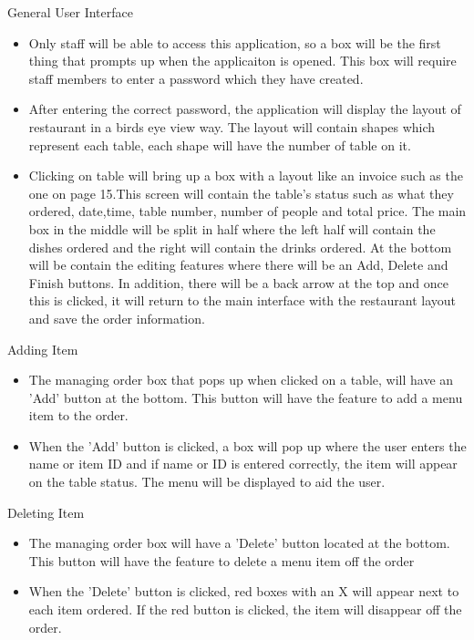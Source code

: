 General User Interface
\begin{itemize}
	\item Only staff will be able to access this application, so a box will be the first thing that prompts up when the applicaiton is opened. This box will require staff members to enter a password which they have created.
	\item After entering the correct password, the application will display the layout of restaurant in a birds eye view way. The layout will contain shapes which represent each table, each shape will have the number of table on it.
	\item Clicking on table will bring up a box with a layout like an invoice such as the one on page 15.This screen will contain the table's status such as what they ordered, date,time, table number, number of people and total price. The main box in the middle will be split in half where the left half will contain the dishes ordered and the right will contain the drinks ordered. At the bottom will be contain the editing features where there will be an Add, Delete and Finish buttons. In addition, there will be a back arrow at the top and once  this is clicked, it will return to the main interface with the restaurant layout and save the order information.

\end{itemize}

Adding Item
\begin{itemize}
	\item The managing order box that pops up when clicked on a table, will have an 'Add' button at the bottom. This button will have the feature to add a menu item to the order.
	\item When the 'Add' button is clicked, a box will pop up where the user enters the name or item ID and if name or ID is entered correctly, the item will appear on the table status. The menu will be displayed to aid the user.
\end{itemize}

Deleting Item
\begin{itemize}
	\item The managing order box will have a 'Delete' button located at the bottom. This button will have the feature to delete a menu item off the order
	\item When the 'Delete' button is clicked, red boxes with an X will appear next to each item ordered. If the red button is clicked, the item will disappear off the order.
\end{itemize}

